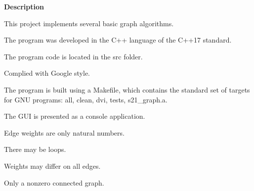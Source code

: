 \thispagestyle{plain}
\begin{center}
  \Large
  \textbf{Description}

\end{center}
This project implements several basic graph algorithms.
\vspace{0.4cm}

The program was developed in the C++ language of the C++17 standard.

\vspace{0.4cm}

The program code is located in the src folder.

\vspace{0.4cm}

Complied with Google style.

\vspace{0.4cm}

The program is built using a Makefile, which contains the standard set of targets for GNU programs: all, clean, dvi, tests, s21\_graph.a.

\vspace{0.4cm}

The GUI is presented as a console application.

\vspace{0.4cm}

Edge weights are only natural numbers.

\vspace{0.4cm}

There may be loops.

\vspace{0.4cm}

Weights may differ on all edges.

\vspace{0.4cm}

Only a nonzero connected graph.
